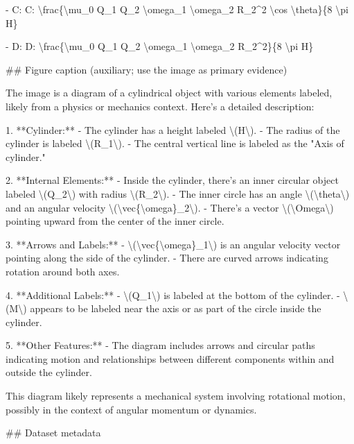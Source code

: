 - C: C: \textbackslash{}frac\{\textbackslash{}mu\_0 Q\_1 Q\_2 \textbackslash{}omega\_1 \textbackslash{}omega\_2 R\_2\textasciicircum{}2 \textbackslash{}cos \textbackslash{}theta\}\{8 \textbackslash{}pi H\}

- D: D: \textbackslash{}frac\{\textbackslash{}mu\_0 Q\_1 Q\_2 \textbackslash{}omega\_1 \textbackslash{}omega\_2 R\_2\textasciicircum{}2\}\{8 \textbackslash{}pi H\}

\#\# Figure caption (auxiliary; use the image as primary evidence)

The image is a diagram of a cylindrical object with various elements labeled, likely from a physics or mechanics context. Here's a detailed description:

1. **Cylinder:**
   - The cylinder has a height labeled \textbackslash{}(H\textbackslash{}).
   - The radius of the cylinder is labeled \textbackslash{}(R\_1\textbackslash{}).
   - The central vertical line is labeled as the "Axis of cylinder."

2. **Internal Elements:**
   - Inside the cylinder, there's an inner circular object labeled \textbackslash{}(Q\_2\textbackslash{}) with radius \textbackslash{}(R\_2\textbackslash{}).
   - The inner circle has an angle \textbackslash{}(\textbackslash{}theta\textbackslash{}) and an angular velocity \textbackslash{}(\textbackslash{}vec\{\textbackslash{}omega\}\_2\textbackslash{}).
   - There's a vector \textbackslash{}(\textbackslash{}Omega\textbackslash{}) pointing upward from the center of the inner circle.

3. **Arrows and Labels:**
   - \textbackslash{}(\textbackslash{}vec\{\textbackslash{}omega\}\_1\textbackslash{}) is an angular velocity vector pointing along the side of the cylinder.
   - There are curved arrows indicating rotation around both axes.

4. **Additional Labels:**
   - \textbackslash{}(Q\_1\textbackslash{}) is labeled at the bottom of the cylinder.
   - \textbackslash{}(M\textbackslash{}) appears to be labeled near the axis or as part of the circle inside the cylinder.

5. **Other Features:**
   - The diagram includes arrows and circular paths indicating motion and relationships between different components within and outside the cylinder.

This diagram likely represents a mechanical system involving rotational motion, possibly in the context of angular momentum or dynamics.

\#\# Dataset metadata

